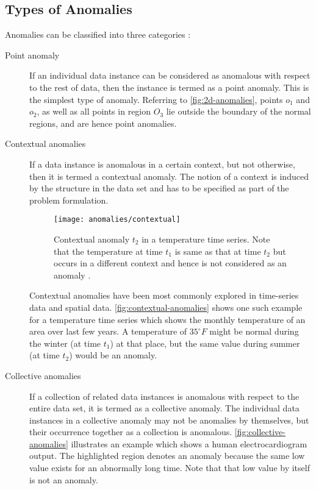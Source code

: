 \subsection{Types of Anomalies}
\label{anomalyDetection:types}
Anomalies can be classified into three categories \cite{Chandola:2007}:

\begin{description}

\item[Point anomaly] If an individual data instance can be considered as
anomalous with respect to the rest of data, then the instance is termed as a
point anomaly. This is the simplest type of anomaly. Referring to
\autoref{fig:2d-anomalies}, points $o_1$ and $o_2$, as well as all points in
region $O_3$ lie outside the boundary of the normal regions, and are hence point
anomalies.

\item[Contextual anomalies] If a data instance is anomalous in a certain
context, but not otherwise, then it is termed a contextual anomaly. The notion
of a context is induced by the structure in the data set and has to be specified
as part of the problem formulation.

\begin{figure}
    \centering
    \texttt{[image: anomalies/contextual]}
    \caption[Contextual anomaly $t_2$ in a temperature time series.]
        {Contextual anomaly $t_2$ in a temperature time series. Note that the
        temperature at time $t_1$ is same as that at time $t_2$ but occurs in a
        different context and hence is not considered as an anomaly
        \cite{Chandola:2007}.}
    \label{fig:contextual-anomalies}
\end{figure}

Contextual anomalies have been most commonly explored in time-series data and
spatial data. \autoref{fig:contextual-anomalies} shows one such example for a
temperature time series which shows the monthly temperature of an area over last
few years. A temperature of $35^\circ F$ might be normal during the winter (at
time $t_1$) at that place, but the same value during summer (at time $t_2$)
would be an anomaly.

\item[Collective anomalies] If a collection of related data instances is
anomalous with respect to the entire data set, it is termed as a collective
anomaly. The individual data instances in a collective anomaly may not be
anomalies by themselves, but their occurrence together as a collection is
anomalous. \autoref{fig:collective-anomalies} illustrates an example which shows
a human electrocardiogram output. The highlighted region denotes an anomaly
because the same low value exists for an abnormally long time. Note that that
low value by itself is not an anomaly.


\end{description}
